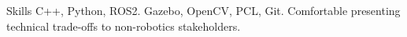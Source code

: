 \begin{rubric}{Skills}
\entry*[Languages]
  C++, Python, ROS2.
\entry*[Tools]
  Gazebo, OpenCV, PCL, Git.
\entry*
  Comfortable presenting technical trade-offs to non-robotics stakeholders.
\end{rubric}
